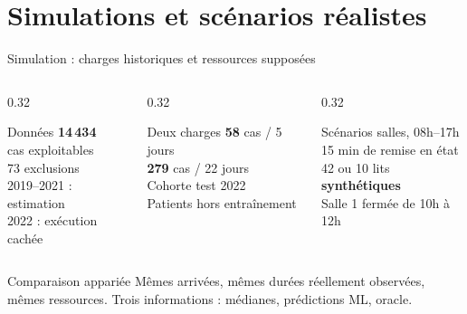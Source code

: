 \section{Simulations et scénarios réalistes}

\begin{frame}{Simulation : charges historiques et ressources supposées}
  \small
  \begin{columns}[T,onlytextwidth]
    \begin{column}{0.32\textwidth}
      \begin{block}{Données}
        \centering
        {\Large\bfseries 14\,434}\\
        cas exploitables\\[5pt]
        73 exclusions\\[5pt]
        2019--2021 : estimation\\
        2022 : exécution cachée
      \end{block}
    \end{column}
    \begin{column}{0.32\textwidth}
      \begin{block}{Deux charges}
        \centering
        {\Large\bfseries 58} cas / 5 jours\\[5pt]
        {\Large\bfseries 279} cas / 22 jours\\[5pt]
        Cohorte test 2022\\
        Patients hors entraînement
      \end{block}
    \end{column}
    \begin{column}{0.32\textwidth}
      \begin{block}{Scénarios}
         salles, 08h--17h\\
        15 min de remise en état\\[5pt]
        42 ou 10 lits \textbf{synthétiques}\\
        Salle 1 fermée de 10h à 12h
      \end{block}
    \end{column}
  \end{columns}
  \vspace{0.23cm}
  \begin{exampleblock}{Comparaison appariée}
    \small Mêmes arrivées, mêmes durées réellement observées, mêmes
    ressources. Trois informations : médianes, prédictions ML, oracle.
  \end{exampleblock}
\end{frame}

